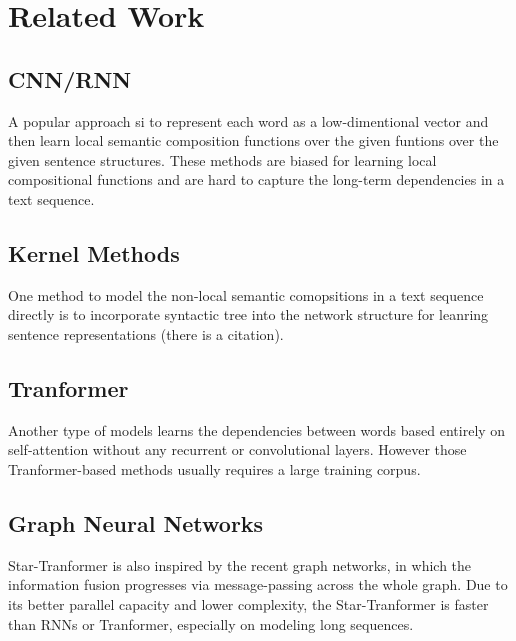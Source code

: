 \section{Related Work}

\subsection{CNN/RNN}

A popular approach si to represent each word as a low-dimentional vector and
then learn local semantic composition functions over the given funtions over the
given sentence structures.
These methods are biased for learning local compositional functions and are hard
to capture the long-term dependencies in a text sequence.

\subsection{Kernel Methods}

One method to model the non-local semantic comopsitions in a text sequence
directly is to incorporate syntactic tree into the network structure for
leanring sentence representations (there is a citation).

\subsection{Tranformer}

Another type of models learns the dependencies between words based entirely on
self-attention without any recurrent or convolutional layers. However those
Tranformer-based methods usually requires a large training corpus.

\subsection{Graph Neural Networks}

Star-Tranformer is also inspired by the recent graph networks, in which the
information fusion progresses via message-passing across the whole graph.
Due to its better parallel capacity and lower complexity, the Star-Tranformer is
faster than RNNs or Tranformer, especially on modeling long sequences.
